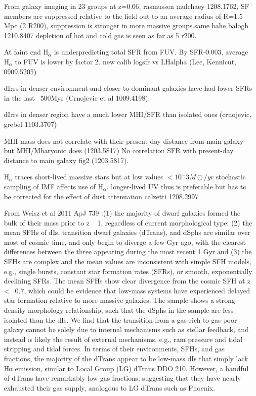 \documentclass[12pt,preprint]{emulateapj}
\begin{document}
From galaxy imaging in 23 groups at z=0.06, rasmussen mulchaey 1208.1762, SF members are suppressed relative to the field out to an average radius of 
R=1.5 Mpc (2 R200), suppression is stronger in more massive groups.same bahe balogh 1210.8407 depletion of hot and cold gas is seen as far as 5 r200.

At faint end H$_\alpha$ is underpredicting total SFR from FUV. By SFR-0.003, average H$_\alpha$ to FUV is lower by factor 2. new calib logsfr vs LHalpha 
(Lee, Kennicut, 0909.5205)

dIrrs in denser environment and closer to dominant galaxies have had lower SFRs in the last ~500Myr (Crnojevic et al 1009.4198).

dIrrs in denser region have a much lower MHI/SFR than isolated ones (crnojevic, grebel 1103.3707)

MHI mass does not correlate with their present day distance from main galaxy but MHI/Mbaryonic does (1203.5817)
No correlation SFR with present-day distance to main galaxy fig2 (1203.5817).

H$_\alpha$ traces short-lived massive stars but at low values $<10^-3 M\odot/yr$ stochastic sampling of IMF affects use of H$_\alpha$. longer-lived UV thus 
is preferable but has to be corrected for the effect of dust attenuation calzetti 1208.2997

From Weisz et al 2011 ApJ 739 :(1) the majority of dwarf galaxies formed the bulk of their mass prior to z ~ 1, 
regardless of current morphological type; (2) the mean SFHs of dIs, transition dwarf galaxies (dTrans), and dSphs 
are similar over most of cosmic time, and only begin to diverge a few Gyr ago, with the clearest differences between 
the three appearing during the most recent 1 Gyr and (3) the SFHs are complex and the mean values are inconsistent 
with simple SFH models, e.g., single bursts, constant star formation rates (SFRs), or smooth, exponentially declining SFRs.
 The mean SFHs show clear divergence from the cosmic SFH at z <~ 0.7, which could be evidence that low-mass systems have 
experienced delayed star formation relative to more massive galaxies. The sample shows a strong density-morphology 
relationship, such that the dSphs in the sample are less isolated than the dIs. We find that the transition from a 
gas-rich to gas-poor galaxy cannot be solely due to internal mechanisms such as stellar feedback, and instead is likely 
the result of external mechanisms, e.g., ram pressure and tidal stripping and tidal forces. In terms of their environments,
 SFHs, and gas fractions, the majority of the dTrans appear to be low-mass dIs that simply lack Hα emission, similar to 
Local Group (LG) dTrans DDO 210. However, a handful of dTrans have remarkably low gas fractions, 
suggesting that they have nearly exhausted their gas supply, analogous to LG dTrans such as Phoenix. 
\end{document}
